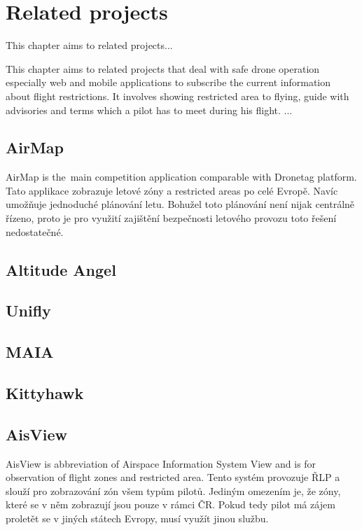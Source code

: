 \chapter{Related projects}\label{ch:related-projects}
This chapter aims to related projects...

This chapter aims to related projects that deal with safe drone operation especially web and mobile applications to subscribe the current information about flight restrictions.
It involves showing restricted area to flying, guide with advisories and terms which a pilot has to meet during his flight.
...

\section{AirMap}\label{sec:airmap}
AirMap is the~main competition application comparable with Dronetag platform.%
Tato applikace zobrazuje letové zóny a restricted areas po celé Evropě.
Navíc umožňuje jednoduché plánování letu.
Bohužel toto plánování není nijak centrálně řízeno, proto je pro využití zajištění bezpečnosti letového provozu toto řešení nedostatečné.

\section{Altitude Angel}\label{sec:altitude-angel}

\section{Unifly}\label{sec:unifly}

\section{MAIA}\label{sec:maia}

\section{Kittyhawk}\label{sec:kittyhawk}

\section{AisView}\label{sec:aisview}
AisView is abbreviation of Airspace Information System View and is for observation of flight zones and restricted area.
Tento systém provozuje ŘLP a slouží pro zobrazování zón všem typům pilotů.
Jediným omezením je, že zóny, které se v něm zobrazují jsou pouze v rámci ČR.
Pokud tedy pilot má zájem proletět se v jiných státech Evropy, musí využít jinou službu.

